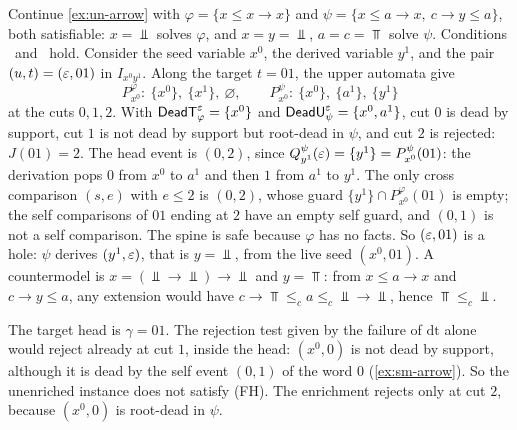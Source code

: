 \begin{example}\label{ex:ex-arrow}
Continue \cref{ex:un-arrow} with $\varphi=\{x\le x\to x\}$ and
$\psi=\{x\le a\to x,\ c\to y\le a\}$, both satisfiable: $x=\Bot$ solves
$\varphi$, and $x=y=\Bot$, $a=c=\Top$ solve $\psi$. Conditions \CondI\ and
\CondU\ hold. Consider the seed variable $x^0$, the derived variable $y^1$,
and the pair $(u,t)=(\varepsilon,01)$ in $I_{x^0y^1}$. Along the target $t=01$, the
upper automata give
\[
 P^\varphi_{x^0}:\ \{x^0\},\ \{x^1\},\ \varnothing,\qquad
 P^\psi_{x^0}:\ \{x^0\},\ \{a^1\},\ \{y^1\}
\]
at the cuts $0,1,2$. With $\mathsf{DeadT}^\varepsilon_\varphi=\{x^0\}$ and
$\mathsf{DeadU}^\varepsilon_\psi=\{x^0,a^1\}$, cut $0$ is dead by support, cut $1$ is not dead
by support but root-dead in $\psi$, and cut $2$ is rejected: $J(01)=2$. The
head event is $(0,2)$, since $Q^\psi_{y^1}(\varepsilon)=\{y^1\}=P^\psi_{x^0}(01)$: the
derivation pops $0$ from $x^0$ to $a^1$ and then $1$ from $a^1$ to $y^1$. The
only cross comparison $(s,e)$ with $e\le2$ is $(0,2)$, whose guard
$\{y^1\}\cap P^\varphi_{x^0}(01)$ is empty; the self comparisons of $01$ ending
at $2$ have an empty self guard, and $(0,1)$ is not a self comparison. The
spine is safe because $\varphi$ has no facts. So $(\varepsilon,01)$ is a
hole: $\psi$ derives $(y^1,\varepsilon)$, that is $y=\Bot$, from the live seed
$(x^0,01)$. A countermodel is $x=(\Bot\to\Bot)\to\Bot$ and $y=\Top$: from
$x\le a\to x$ and $c\to y\le a$, any extension would have
$c\to\Top\le_c a\le_c\Bot\to\Bot$, hence $\Top\le_c\Bot$.

The target head is $\gamma=01$. The rejection test given by the failure of
$\mathrm{dt}$ alone would reject already at cut $1$, inside the head: $(x^0,0)$
is not dead by support, although it is dead by the self event $(0,1)$ of the
word $0$ (\cref{ex:sm-arrow}). So the unenriched instance does not satisfy
(FH). The enrichment rejects only at cut $2$, because $(x^0,0)$ is root-dead
in $\psi$.
\end{example}
